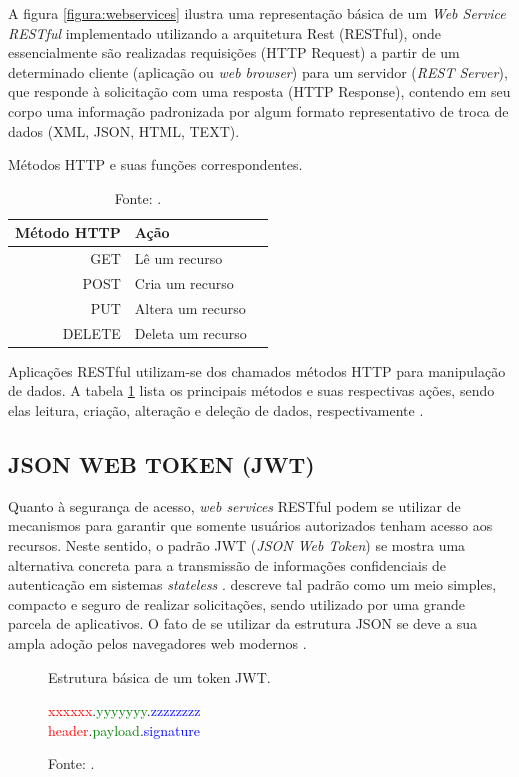 A figura \ref{figura:webservices} ilustra uma representação básica de um \textit{Web Service RESTful} implementado utilizando a arquitetura Rest (RESTful), onde essencialmente são realizadas requisições (HTTP Request) a partir de um determinado cliente (aplicação ou \textit{web browser}) para um servidor (\textit{REST Server}), que responde à solicitação com uma resposta (HTTP Response), contendo em seu corpo uma informação padronizada por algum formato representativo de troca de dados (XML, JSON, HTML, TEXT).

\begin{table}[h]
	\captionsetup{justification=centering}
	\centering
	\caption{Métodos HTTP e suas funções correspondentes.}
	\caption*{Fonte: .}
	\label{tabela:metodoshttp}
	\begin{tabular}{r|lr}
		Método HTTP &  Ação\\
		\hline
		GET & Lê um recurso  \\
		POST & Cria um recurso  \\
		PUT & Altera um recurso \\
		DELETE & Deleta um recurso 
	\end{tabular}
\end{table}

Aplicações RESTful utilizam-se dos chamados métodos HTTP para manipulação de dados. A tabela \ref{tabela:metodoshttp} lista os principais métodos e suas respectivas ações, sendo elas leitura, criação, alteração e deleção de dados, respectivamente \cite{pautasso2008restful}.

\subsection{JSON WEB TOKEN (JWT)}

Quanto à segurança de acesso, \textit{web services} RESTful podem se utilizar de mecanismos para garantir que somente usuários autorizados tenham acesso aos recursos. Neste sentido, o padrão JWT (\textit{JSON Web Token}) \cite{jwt} se mostra uma alternativa concreta para a transmissão de informações confidenciais de autenticação em sistemas \textit{stateless} \cite{jones2015json}.  descreve tal padrão como um meio simples, compacto e seguro de realizar solicitações, sendo utilizado por uma grande parcela de aplicativos. O fato de se utilizar da estrutura JSON se deve a sua ampla adoção pelos  navegadores web modernos \cite{jones2011emerging}.

\begin{figure}[h]
	\caption{Estrutura básica de um token JWT.}
	\caption*{Fonte: .}
	\label{figura:jwt}
	\begin{center}
		\textcolor{red}{xxxxxx}.\textcolor{green}{yyyyyyy}.\textcolor{blue}{zzzzzzzz}\\
		\textcolor{red}{header}.\textcolor{green}{payload}.\textcolor{blue}{signature}\\
	\end{center}
\end{figure}

